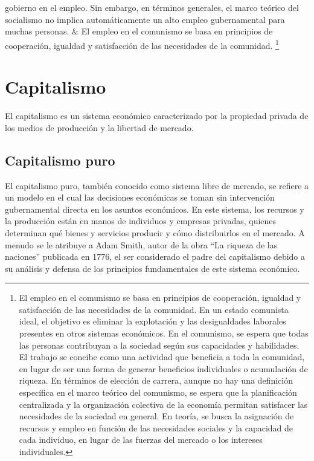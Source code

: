 \documentclass[
  man,
  floatsintext,
  longtable,
  a4paper,
  nolmodern,
  notxfonts,
  notimes,
  colorlinks=true,linkcolor=blue,citecolor=blue,urlcolor=blue]{apa7}
\begin{document}
\begin{longtable}[]
{  gobierno en el empleo. Sin embargo, en términos generales, el marco
  teórico del socialismo no implica automáticamente un alto empleo
  gubernamental para muchas personas.} & El empleo en el comunismo se
basa en principios de cooperación, igualdad y satisfacción de las
necesidades de la comunidad. \footnote{El empleo en el comunismo se basa
  en principios de cooperación, igualdad y satisfacción de las
  necesidades de la comunidad. En un estado comunista ideal, el objetivo
  es eliminar la explotación y las desigualdades laborales presentes en
  otros sistemas económicos. En el comunismo, se espera que todas las
  personas contribuyan a la sociedad según sus capacidades y
  habilidades. El trabajo se concibe como una actividad que beneficia a
  toda la comunidad, en lugar de ser una forma de generar beneficios
  individuales o acumulación de riqueza. En términos de elección de
  carrera, aunque no hay una definición específica en el marco teórico
  del comunismo, se espera que la planificación centralizada y la
  organización colectiva de la economía permitan satisfacer las
  necesidades de la sociedad en general. En teoría, se busca la
  asignación de recursos y empleo en función de las necesidades sociales
  y la capacidad de cada individuo, en lugar de las fuerzas del mercado
  o los intereses individuales.} \\
\end{longtable}

\section{Capitalismo}\label{capitalismo}

El capitalismo es un sistema económico caracterizado por la propiedad
privada de los medios de producción y la libertad de mercado.

\subsection{Capitalismo puro}\label{capitalismo-puro}

El capitalismo puro, también conocido como sistema libre de mercado, se
refiere a un modelo en el cual las decisiones económicas se toman sin
intervención gubernamental directa en los asuntos económicos. En este
sistema, los recursos y la producción están en manos de individuos y
empresas privadas, quienes determinan qué bienes y servicios producir y
cómo distribuirlos en el mercado. A menudo se le atribuye a Adam Smith,
autor de la obra ``La riqueza de las naciones'' publicada en 1776, el
ser considerado el padre del capitalismo debido a su análisis y defensa
de los principios fundamentales de este sistema económico.
\end{document}
